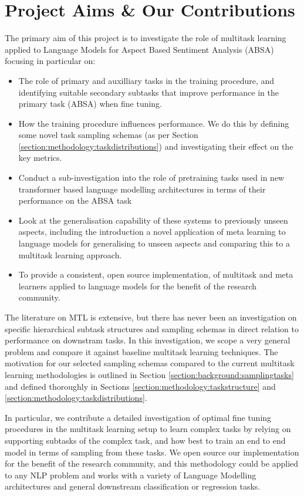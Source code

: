 \section{Project Aims \& Our Contributions} \label{section:intro:projectaims}
The primary aim of this project is to investigate the role of multitask learning applied to Language Models for Aspect Based Sentiment Analysis (ABSA) focusing in particular on:
\begin{itemize}
	\item The role of primary and auxilliary tasks in the training procedure, and identifying suitable secondary subtasks that improve performance in the primary task (ABSA) when fine tuning.
	\item How the training procedure influences performance. We do this by defining some novel task sampling schemas (as per Section \ref{section:methodology:taskdistributions}) and investigating their effect on the key metrics.
	\item Conduct a sub-investigation into the role of pretraining tasks used in new transformer based language modelling architectures in terms of their performance on the ABSA task
	\item Look at the generalisation capability of these systems to previously unseen aspects, including the  introduction a novel application of meta learning to language models for generalising to unseen aspects and comparing this to a multitask learning approach.
	\item To provide a consistent, open source implementation, of multitask and meta learners applied to language models for the benefit of the research community.
\end{itemize}

The literature on MTL is extensive, but there has never been an investigation on specific hierarchical subtask structures and sampling schemas in direct relation to performance on downstram tasks. In this investigation, we scope a very general problem and compare it against baseline multitask learning techniques. The motivation for our selected sampling schemas compared to the current multitask learning methodologies is outlined in Section \ref{section:background:samplingtasks} and defined thoroughly in Sections \ref{section:methodology:taskstructure} and \ref{section:methodology:taskdistributions}.

In particular, we contribute a detailed investigation of optimal fine tuning procedures in the multitask learning setup to learn complex tasks by relying on supporting subtasks of the complex task, and how best to train an end to end model in terms of sampling from these tasks. We open source our implementation for the benefit of the research community, and this methodology could be applied to any NLP problem and works with a variety of Language Modelling architectures and general downstream classification or regression tasks.

